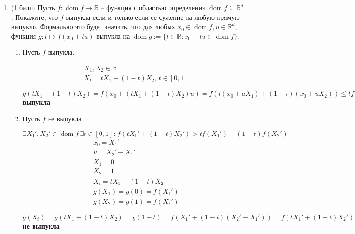 \documentclass[a5paper,twoside,russian]{article}
\begin{document}
\begin{enumerate}[label=\textbf{Задача \arabic*.}]
\begin{enumerate}
\begin{prf}
            $f(X_1) = f(X_2) = 0, f(X_t) = \frac{1}{2} > t f(X_1) + (1-t) f(X-2) = 0 \Rightarrow f$ \textbf{не выпукла}

        \end{prf}
    \end{enumerate}

    \item (1 балл) Пусть $f : \operatorname{dom} f \rightarrow \mathbb{R}$ -- функция с областью определения $\operatorname{dom} f \subseteq \mathbb{R}^d$. Покажите, что $f$ выпукла если и только если ее сужение на любую прямую выпукло. Формально это будет значить, что для любых $x_0 \in \operatorname{dom} f,u\in\mathbb{R}^d$, функция
$g: t\mapsto f(x_0 + tu)$ выпукла на  $\operatorname{dom} g:= \{{t\in\mathbb{R} : x_0 + tu\in \operatorname{dom} f}\}$.

    \begin{prf}
        \begin{enumerate}
            \item Пусть $f$ выпукла.
            
            \[
            \begin{aligned}
                & X_1, X_2 \in \mathbb{R}   \\              
                & X_t = tX_1 + (1-t)X_2, \, t \in [0, 1]
            \end{aligned}
            \]

            $g(tX_1 + (1-t)X_2) = f(x_0 + (tX_1 + (1-t)X_2)u) = f(t(x_0 + aX_1) + (1-t)(x_0 + uX_2)) \leq t f(x_0 + aX_1) + (1-t)f(x_0 + uX_2) = tg(X_1) + (1-t)g(X_2) \Rightarrow g$ \textbf{выпукла}

            \item Пусть $f$ не выпукла
            
            $\exists X_1', X_2' \in \operatorname{dom} f \, \exists t \in [0, 1]: \, f(tX_1' + (1-t)X_2') > tf(X_1') + (1-t)f(X_2')$
            \[
            \begin{aligned}
                & x_0 = X_1' \\
                & u = X_2' - X_1' \\
                & X_1 = 0 \\
                & X_2 = 1 \\
                & X_t = tX_1 + (1-t)X_2 \\
                & g(X_1) = g(0) = f(X_1') \\
                & g(X_2) = g(1) = f(X_2')
            \end{aligned}
            \]


            $g(X_t) = g(tX_1 + (1-t)X_2) = g(1-t) = f(X_1' + (1-t)(X_2' - X_1')) = f(tX_1' + (1-t)X_2') > tf(X_1') + (1-t)f(X_2') = tg(X_1) + (1-t)g(X_2) \Rightarrow g$ \textbf{не выпукла}
        \end{enumerate}

    \end{prf}

\end{enumerate}
\end{document}
